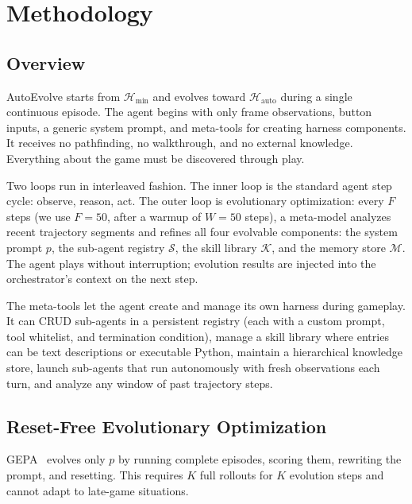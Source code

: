 \section{Methodology}\label{sec:methodology}

\subsection{Overview}

AutoEvolve starts from $\mathcal{H}_{\min}$ and evolves toward $\mathcal{H}_{\text{auto}}$ during a single continuous episode. The agent begins with only frame observations, button inputs, a generic system prompt, and meta-tools for creating harness components. It receives no pathfinding, no walkthrough, and no external knowledge. Everything about the game must be discovered through play.

Two loops run in interleaved fashion. The inner loop is the standard agent step cycle: observe, reason, act. The outer loop is evolutionary optimization: every $F$ steps (we use $F{=}50$, after a warmup of $W{=}50$ steps), a meta-model analyzes recent trajectory segments and refines all four evolvable components: the system prompt $p$, the sub-agent registry $\mathcal{S}$, the skill library $\mathcal{K}$, and the memory store $\mathcal{M}$. The agent plays without interruption; evolution results are injected into the orchestrator's context on the next step.

The meta-tools let the agent create and manage its own harness during gameplay. It can CRUD sub-agents in a persistent registry (each with a custom prompt, tool whitelist, and termination condition), manage a skill library where entries can be text descriptions or executable Python, maintain a hierarchical knowledge store, launch sub-agents that run autonomously with fresh observations each turn, and analyze any window of past trajectory steps.


\subsection{Reset-Free Evolutionary Optimization}\label{sec:evolution}

GEPA~\citep{agrawal2025gepa} evolves only $p$ by running complete episodes, scoring them, rewriting the prompt, and resetting. This requires $K$ full rollouts for $K$ evolution steps and cannot adapt to late-game situations.

